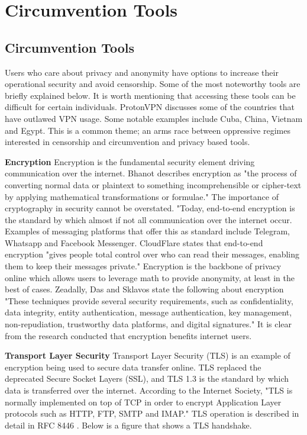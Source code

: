 \chapter{Circumvention Tools}
\section{Circumvention Tools}
Users who care about privacy and anonymity have options to increase their operational security and avoid censorship. Some of the most noteworthy tools are briefly explained below. It is worth mentioning that accessing these tools can be difficult for certain individuals. ProtonVPN discusses some of the countries that have outlawed VPN usage. \cite{protonvpn_vpn_legality_2} Some notable examples include Cuba, China, Vietnam and Egypt. This is a common theme; an arms race between oppressive regimes interested in censorship and circumvention and privacy based tools.

\textbf{Encryption}
Encryption is the fundamental security element driving communication over the internet. Bhanot describes encryption as "the process of converting normal data or plaintext to something incomprehensible or cipher-text by applying mathematical transformations or formulae." \cite{bhanot2015review} The importance of cryptography in security cannot be overstated. "Today, end-to-end encryption is the standard by which almost if not all communication over the internet occur. Examples of messaging platforms that offer this as standard include Telegram, Whatsapp and Facebook Messenger. CloudFlare states that end-to-end encryption "gives people total control over who can read their messages, enabling them to keep their messages private." \cite{cloudflare_e2ee} Encryption is the backbone of privacy online which allows users to leverage math to provide anonymity, at least in the best of cases. Zeadally, Das and Sklavos state the following about encryption "These techniques provide several security requirements, such as confidentiality, data integrity, entity authentication, message authentication, key management, non-repudiation, trustworthy data platforms, and digital signatures." \cite{ZEADALLY2021100075} It is clear from the research conducted that encryption benefits internet users. 

\textbf{Transport Layer Security}
Transport Layer Security (TLS) is an example of encryption being used to secure data transfer online. TLS replaced the deprecated Secure Socket Layers (SSL), and TLS 1.3 is the standard by which data is transferred over the internet. According to the Internet Society, "TLS is normally implemented on top of TCP in order to encrypt Application Layer protocols such as HTTP, FTP, SMTP and IMAP." \cite{internetsociety_tls_basics} TLS operation is described in detail in RFC 8446 \cite{rfc8446} \cite{cloudflare_tls_handshake}. Below is a figure that shows a TLS handshake.


